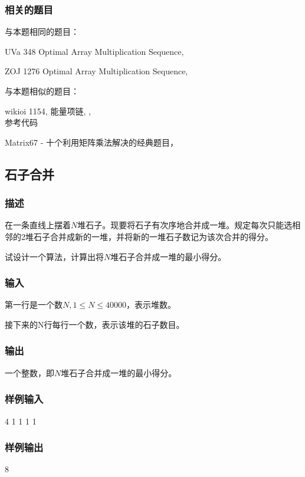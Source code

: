 \subsubsection{相关的题目}
与本题相同的题目：
\begindot
\item UVa 348 Optimal Array Multiplication Sequence, 
\item ZOJ 1276 Optimal Array Multiplication Sequence, 
\myenddot

与本题相似的题目：
\begindot
\item wikioi 1154, 能量项链, , \\
参考代码 
\item Matrix67 - 十个利用矩阵乘法解决的经典题目，
\myenddot


\subsection{石子合并}
\subsubsection{描述}
在一条直线上摆着$N$堆石子。现要将石子有次序地合并成一堆。规定每次只能选相邻的2堆石子合并成新的一堆，并将新的一堆石子数记为该次合并的得分。

试设计一个算法，计算出将$N$堆石子合并成一堆的最小得分。

\subsubsection{输入}
第一行是一个数$N, 1 \leq N \leq 40000$，表示堆数。

接下来的N行每行一个数，表示该堆的石子数目。

\subsubsection{输出}
一个整数，即$N$堆石子合并成一堆的最小得分。

\subsubsection{样例输入}
\begin{Code}
4
1
1
1
1
\end{Code}

\subsubsection{样例输出}
\begin{Code}
8
\end{Code}

